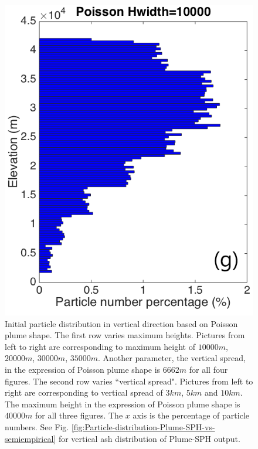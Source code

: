 \documentclass[utf8]{frontiersSCNS} %
\begin{document}
\begin{figure}[!htb]
\begin{minipage}{.247 \textwidth}
\end{minipage}%
\begin{minipage}{.247 \textwidth}
\centering
\includegraphics[width=0.99 \textwidth]{Figures/Possion-Hwidth10k-ParticleDis-z}
\end{minipage}%
\caption{Initial particle distribution in vertical direction based on Poisson plume shape. The first row varies maximum heights. Pictures from left to right are corresponding to maximum height of $10000 m$, $20000 m$, $30000 m$, $35000 m$. Another parameter, the vertical spread, in the expression of Poisson plume shape is $6662 m$ for all four figures. The second row varies ``vertical spread". Pictures from left to right are corresponding to vertical spread of $3km$, $5km$ and $10 km$. The maximum height in the expression of Poisson plume shape is $40000 m$ for all three figures. The $x$ axis is the percentage of particle numbers. See Fig. \ref{fig:Particle-distribution-Plume-SPH-vs-semiempirical} for vertical ash distribution of Plume-SPH output.}
\label{fig:Particle-distribution-Plume-calibrate-semiempirical}
\end{figure}
\end{document}
